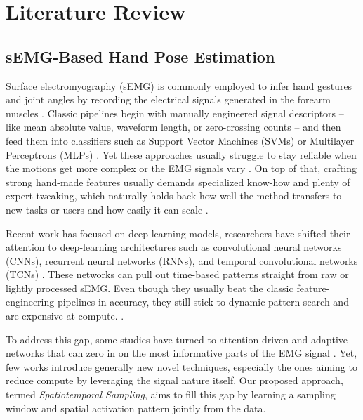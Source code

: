 \chapter{Literature Review}
\label{chap:lr}

\section{sEMG-Based Hand Pose Estimation}

Surface electromyography (sEMG) is commonly employed to infer hand gestures and joint angles by recording the electrical signals generated in the forearm muscles \cite{oskoei2007myoelectric, simao2019review}. Classic pipelines begin with manually engineered signal descriptors -- like mean absolute value, waveform length, or zero-crossing counts -- and then feed them into classifiers such as Support Vector Machines (SVMs) or Multilayer Perceptrons (MLPs) \cite{oladazimi2012review, liu2007recognition}. Yet these approaches usually struggle to stay reliable when the motions get more complex or the EMG signals vary \cite{parajuli2019real}. On top of that, crafting strong hand-made features usually demands specialized know-how and plenty of expert tweaking, which naturally holds back how well the method transfers to new tasks or users and how easily it can scale \cite{atzori2016deep, oskoei2008support, phinyomark2018feature}.

Recent work has focused on deep learning models, researchers have shifted their attention to deep-learning architectures such as convolutional neural networks (CNNs), recurrent neural networks (RNNs), and temporal convolutional networks (TCNs) \cite{ameri2019regression, briouza2021convolutional, zhang2023lstm}. These networks can pull out time-based patterns straight from raw or lightly processed sEMG. Even though they usually beat the classic feature-engineering pipelines in accuracy, they still stick to dynamic pattern search and are expensive at compute. \cite{lee2022explainable}.

To address this gap, some studies have turned to attention-driven and adaptive networks that can zero in on the most informative parts of the EMG signal \cite{yang2025stcnet, hu2019semg}. Yet, few works introduce generally new novel techniques, especially the ones aiming to reduce compute by leveraging the signal nature itself. Our proposed approach, termed \textit{Spatiotemporal Sampling}, aims to fill this gap by learning a sampling window and spatial activation pattern jointly from the data.

